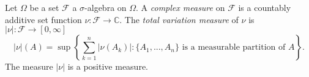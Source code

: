 Let $\Omega$ be a set $\mathcal{F}$ a $\sigma$-algebra on $\Omega$.
A \emph{complex measure} on $\mathcal{F}$
is a countably additive set function
$\nu:\mathcal{F}\to\mathbb{C}$.
The \emph{total variation measure} of $\nu$ is $|\nu|:\mathcal{F}\to [0,\infty]$
$$|\nu|(A)=\sup\left\{\sum_{k=1}^n |\nu(A_k)|:\text{$\{A_1,...,A_n\}$ is a measurable partition of $A$}\right\}.$$
The measure $|\nu|$ is a positive measure.














